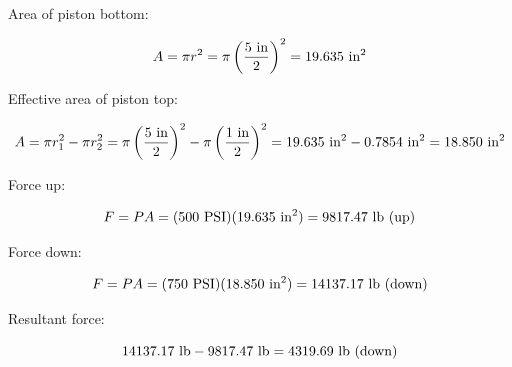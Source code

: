 \vskip 10pt

Area of piston bottom:

$$A = \pi r^2 = \pi \left(5 \hbox{ in} \over 2 \right)^2 = 19.635 \hbox{ in}^2$$

Effective area of piston top:

$$A = \pi r_1^2 - \pi r_2^2 = \pi \left(5 \hbox{ in} \over 2 \right)^2 - \pi \left(1 \hbox{ in} \over 2 \right)^2 = 19.635 \hbox{ in}^2 - 0.7854 \hbox{ in}^2 = 18.850 \hbox{ in}^2$$

\vskip 30pt

Force up:

$$F = PA = (500 \hbox{ PSI}) (19.635 \hbox{ in}^2) = 9817.47 \hbox{ lb (up)}$$

\vskip 10pt

Force down:

$$F = PA = (750 \hbox{ PSI}) (18.850 \hbox{ in}^2) = 14137.17 \hbox{ lb (down)}$$

\vskip 10pt

Resultant force:

$$14137.17 \hbox{ lb} - 9817.47 \hbox{ lb} = 4319.69 \hbox{ lb (down)}$$




